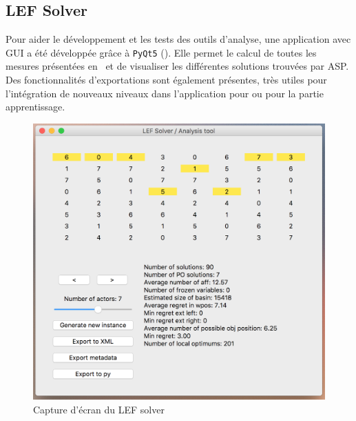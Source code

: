 \documentclass[a4paper, 11pt, titlepage]{article}
\begin{document}
%	
    \printbibliography[heading=bibintoc]
    \begin{appendix}
        \section{LEF Solver}
Pour aider le développement et les tests des outils d'analyse, une application avec GUI a été développée grâce à \texttt{PyQt5} (). Elle permet le calcul de toutes les mesures présentées en~ et de visualiser les différentes solutions trouvées par ASP. Des fonctionnalités d'exportations sont également présentes, très utiles pour l'intégration de nouveaux niveaux dans l'application pour ou pour la partie apprentissage.

\begin{figure}[ht!]
\centering
\includegraphics[width=0.7\linewidth]{lefsolver}
\caption{Capture d'écran du LEF solver}
\label{fig-lefsolver}
\end{figure}
        

\end{appendix}
\end{document}
